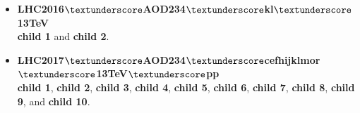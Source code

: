 \begin{itemize}
	
	\item \textbf{LHC2016$\textunderscore$AOD234$\textunderscore$kl$\textunderscore$13TeV} \\
	\textbf{child 1} and \textbf{child 2}.


	\item \textbf{LHC2017$\textunderscore$AOD234$\textunderscore$cefhijklmor$\textunderscore$13TeV$\textunderscore$pp} \\
	\textbf{child 1}, \textbf{child 2}, \textbf{child 3}, \textbf{child 4}, \textbf{child 5}, \textbf{child 6}, \textbf{child 7}, \textbf{child 8}, \textbf{child 9}, and \textbf{child 10}.


\end{itemize}
